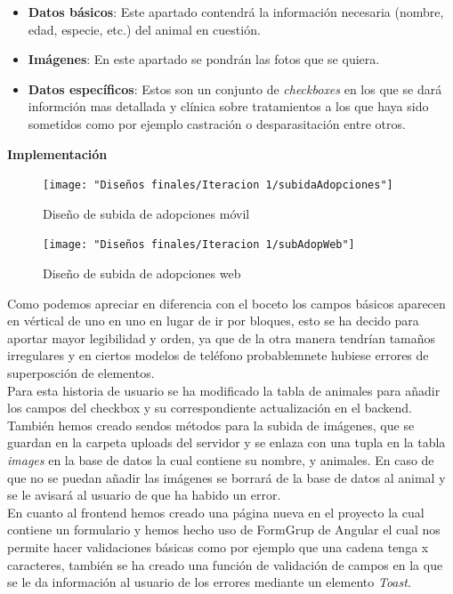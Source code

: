 \begin{itemize}
	\item \textbf{Datos básicos}: Este apartado contendrá la información necesaria (nombre, edad, especie, etc.) del animal en cuestión.
	\item \textbf{Imágenes}: En este apartado se pondrán las fotos que se quiera.
	\item \textbf{Datos específicos}: Estos son un conjunto de \textit{checkboxes} en los que se dará informción mas detallada y clínica sobre tratamientos a los que haya sido sometidos como por ejemplo castración o desparasitación entre otros.
\end{itemize}

\textbf{Implementación} \\

\begin{figure}[H]
	\centering
	\texttt{[image: "Diseños finales/Iteracion 1/subidaAdopciones"]}
	\caption{ Diseño de subida de adopciones móvil}
	\label{fig:subidaadopciones}
\end{figure}


\begin{figure}[H]
	\centering
	\texttt{[image: "Diseños finales/Iteracion 1/subAdopWeb"]}
	\caption{Diseño de subida de adopciones web}
	\label{fig:subadopweb}
\end{figure}

Como podemos apreciar en diferencia con el boceto los campos básicos aparecen en vértical de uno en uno en lugar de ir por bloques, esto se ha decido para aportar mayor legibilidad y orden, ya que de la otra manera tendrían tamaños irregulares y en ciertos modelos de teléfono probablemnete hubiese errores de superposción de elementos. \\

Para esta historia de usuario se ha modificado la tabla de animales para añadir los campos del checkbox y su correspondiente actualización en el backend. También hemos creado sendos métodos para la subida de imágenes, que se guardan en la carpeta uploads del servidor y se enlaza con una tupla en la tabla \textit{images} en la base de datos la cual contiene su nombre, y animales. En caso de que no se puedan añadir las imágenes se borrará de la base de datos al animal y se le avisará al usuario de que ha habido un error. \\


En cuanto al frontend hemos creado una página nueva en el proyecto la cual contiene un formulario y hemos hecho uso de FormGrup de Angular el cual nos permite hacer validaciones básicas como por ejemplo que una cadena tenga x caracteres, también se ha creado una función de validación de campos en la que se le da información al usuario de los errores mediante un elemento \textit{Toast}. \\

